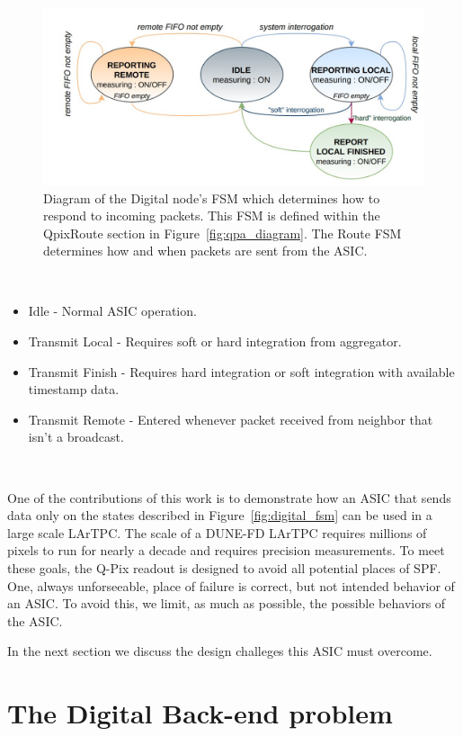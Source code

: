 \begin{figure}[]
\centering
\includegraphics[width=\textwidth]{images/digital_fsm_overview.jpg}
\caption{Diagram of the Digital node's FSM which determines how to respond to incoming packets.
This FSM is defined within the QpixRoute section in Figure~\ref{fig:qpa_diagram}.
The Route FSM determines how and when packets are sent from the ASIC.
}
\end{figure}~\label{fig:digital_fsm}

\begin{itemize}
    \item Idle - Normal ASIC operation.
    \item Transmit Local - Requires soft or hard integration from aggregator.
    \item Transmit Finish - Requires hard integration or soft integration with available timestamp data.
    \item Transmit Remote - Entered whenever packet received from neighbor that isn't a broadcast.
\end{itemize}~\label{fsm_state_labels}

One of the contributions of this work is to demonstrate how an ASIC that sends data only on the states described in Figure~\ref{fig:digital_fsm} can be used in a large scale LArTPC.
The scale of a DUNE-FD LArTPC requires millions of pixels to run for nearly a decade and requires precision measurements.
To meet these goals, the Q-Pix readout is designed to avoid all potential places of SPF.
One, always unforseeable, place of failure is correct, but not intended behavior of an ASIC.
To avoid this, we limit, as much as possible, the possible behaviors of the ASIC.

In the next section we discuss the design challeges this ASIC must overcome.

\section{The Digital Back-end problem}~\label{sec:digital_problem}

